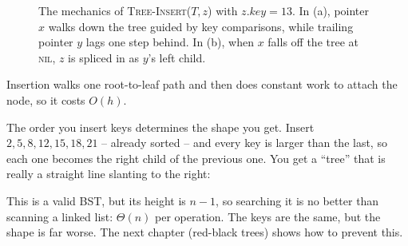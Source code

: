 \begin{figure}[h]
\caption{The mechanics of \textsc{Tree-Insert}($T, z$) with $z.\mathit{key} = 13$. In (a), pointer $x$ walks down the tree guided by key comparisons, while trailing pointer $y$ lags one step behind. In (b), when $x$ falls off the tree at \textsc{nil}, $z$ is spliced in as $y$'s left child.}
\label{ch12:fig-insert-walk}
\end{figure}

Insertion walks one root-to-leaf path and then does constant work to attach the node, so it
costs $O(h)$.

\begin{trapbox}
The order you insert keys determines the shape you get. Insert $2,5,8,12,15,18,21$ -- already
sorted -- and every key is larger than the last, so each one becomes the right child of the
previous one. You get a ``tree'' that is really a straight line slanting to the right:
\begin{center}
\end{center}
This is a valid BST, but its height is $n-1$, so searching it is no better than scanning a
linked list: $\Theta(n)$ per operation. The keys are the same, but the shape is far worse. The
next chapter (red-black trees) shows how to prevent this.
\end{trapbox}

